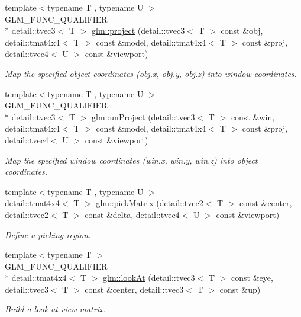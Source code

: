 \begin{DoxyCompactItemize}
{\footnotesize template$<$typename T , typename U $>$ }\\G\-L\-M\-\_\-\-F\-U\-N\-C\-\_\-\-Q\-U\-A\-L\-I\-F\-I\-E\-R \\*
detail\-::tvec3$<$ T $>$ \hyperlink{group__gtc__matrix__transform_ga6f081067aeffc662410dfbabb25f9fdc}{glm\-::project} (detail\-::tvec3$<$ T $>$ const \&obj, detail\-::tmat4x4$<$ T $>$ const \&model, detail\-::tmat4x4$<$ T $>$ const \&proj, detail\-::tvec4$<$ U $>$ const \&viewport)
\begin{DoxyCompactList}\small\item\em Map the specified object coordinates (obj.\-x, obj.\-y, obj.\-z) into window coordinates. \end{DoxyCompactList}\item 
{\footnotesize template$<$typename T , typename U $>$ }\\G\-L\-M\-\_\-\-F\-U\-N\-C\-\_\-\-Q\-U\-A\-L\-I\-F\-I\-E\-R \\*
detail\-::tvec3$<$ T $>$ \hyperlink{group__gtc__matrix__transform_ga540d5f6bb3f41e5dfa38d6ebd8771765}{glm\-::un\-Project} (detail\-::tvec3$<$ T $>$ const \&win, detail\-::tmat4x4$<$ T $>$ const \&model, detail\-::tmat4x4$<$ T $>$ const \&proj, detail\-::tvec4$<$ U $>$ const \&viewport)
\begin{DoxyCompactList}\small\item\em Map the specified window coordinates (win.\-x, win.\-y, win.\-z) into object coordinates. \end{DoxyCompactList}\item 
{\footnotesize template$<$typename T , typename U $>$ }\\detail\-::tmat4x4$<$ T $>$ \hyperlink{group__gtc__matrix__transform_gaf711e3351e368706876106bc64673a91}{glm\-::pick\-Matrix} (detail\-::tvec2$<$ T $>$ const \&center, detail\-::tvec2$<$ T $>$ const \&delta, detail\-::tvec4$<$ U $>$ const \&viewport)
\begin{DoxyCompactList}\small\item\em Define a picking region. \end{DoxyCompactList}\item 
{\footnotesize template$<$typename T $>$ }\\G\-L\-M\-\_\-\-F\-U\-N\-C\-\_\-\-Q\-U\-A\-L\-I\-F\-I\-E\-R \\*
detail\-::tmat4x4$<$ T $>$ \hyperlink{group__gtc__matrix__transform_gae2dca3785b6d5796e876114af58a60a1}{glm\-::look\-At} (detail\-::tvec3$<$ T $>$ const \&eye, detail\-::tvec3$<$ T $>$ const \&center, detail\-::tvec3$<$ T $>$ const \&up)
\begin{DoxyCompactList}\small\item\em Build a look at view matrix. \end{DoxyCompactList}\end{DoxyCompactItemize}


